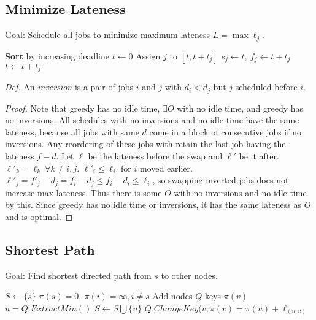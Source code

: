 \subsection*{Minimize Lateness}
Goal: Schedule all jobs to minimize maximum lateness $L = \max \ell_j$. 
\begin{algorithm}[H]
\begin{algorithmic}[1]
\State \textbf{Sort} by increasing deadline
\State $t \gets 0$
\State Assign $j$ to $[t, t+t_j]$
\State $s_j \gets t,\ f_j \gets t+t_j$
\State $t \gets t + t_j$
\EndFor
\State {} 
\EndProcedure
\end{algorithmic}
\end{algorithm}
\textit{Def.} An \textit{inversion} is a pair of jobs $i$ and $j$ with $d_i < d_j$ but $j$ scheduled before $i$. 
\begin{proof}[Proof]
Note that greedy has no idle time, $\exists O$ with no idle time, and greedy has no inversions.
All schedules with no inversions and no idle time have the same lateness, because all jobs with same $d$ come in a block of consecutive jobs if no inversions.
Any reordering of these jobs with retain the last job having the lateness $f-d$. 
Let $\ell$ be the lateness before the swap and $\ell'$ be it after. 
$\ell'_k = \ell_k\ \forall k \neq i, j$. 
$\ell'_i \leq \ell_i$ for $i$ moved earlier. 
$\ell'_j = f'_j - d_j = f_i - d_j \leq f_i - d_i \leq \ell_i$, so swapping inverted jobs does not increase max lateness. 
Thus there is some $O$ with no inversions and no idle time by this. 
Since greedy has no idle time or inversions, it has the same lateness as $O$ and is optimal. 
\end{proof}

\subsection*{Shortest Path}
Goal: Find shortest directed path from $s$ to other nodes. 
\begin{algorithm}[H]
\begin{algorithmic}[1]
\State $S \gets \{s\}$
\State $\pi(s) = 0,\ \pi(i) = \infty, i \neq s$
\State Add nodes $Q$ keys $\pi(v)$
\State $u = Q.ExtractMin()$
\State $S \gets S \bigcup \{u\}$
\State $Q.ChangeKey(v,\pi(v) = \pi(u) + \ell_{(u,v)}$
\EndFor
\EndWhile
\EndProcedure
\end{algorithmic}
\end{algorithm}

